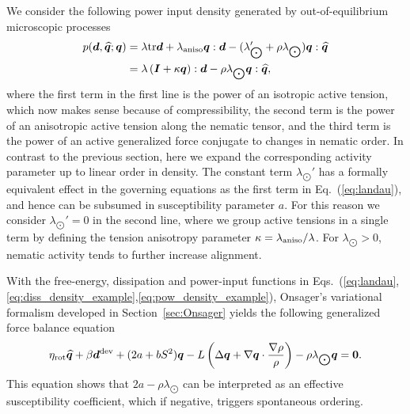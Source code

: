 \documentclass[12pt]{iopart}
\begin{document}
	
	We consider the following power input density generated by out-of-equilibrium microscopic processes 
	\begin{eqnarray} 
		p(\bm{d},\widehat{\bm{q}};{\bm{q}})  & =  \lambda \textup{tr}\bm{d} + \lambda_{\rm aniso} \bm{q}:\bm{d} - (\lambda_{\bigodot}' + \rho \lambda_{\bigodot})  \bm{q} : \widehat{\bm{q}}  \nonumber \\ 
		& =   \lambda \left(\bm{I} + \kappa \bm{q}\right) : \bm{d} - \rho \lambda_{\bigodot}  \bm{q} : \widehat{\bm{q}}, 
		\label{eq:pow_density_example}
	\end{eqnarray}
	where the first term in the first line is the power of an isotropic active tension, which now makes sense because of compressibility, the second term is the power of an anisotropic active tension along the  nematic tensor, and the third term is the power of an active generalized force conjugate to changes in nematic order. In contrast to the previous section, here we expand the corresponding activity parameter up to linear order in density. The constant term $\lambda_{\bigodot}'$ has a formally equivalent effect in the governing equations as the first term in Eq.~(\ref{eq:landau}), and hence can be subsumed in susceptibility parameter $a$.  For this reason we consider $\lambda_{\bigodot}'= 0$ in the second line, where  we group active tensions in a single term by defining the tension anisotropy parameter $\kappa=\lambda_{\rm aniso}/\lambda$. For $\lambda_{\bigodot}>0$, nematic activity tends to further increase alignment.
	
	
	With the free-energy, dissipation and power-input functions in Eqs.~(\ref{eq:landau},\ref{eq:diss_density_example},\ref{eq:pow_density_example}), Onsager's variational formalism developed in Section~\ref{sec:Onsager} yields the following generalized force balance equation
	\begin{equation}  \label{first_govern}
		\eta_{\text{rot}} \widehat{\bm{q}} + \beta \bm{d}^{\rm dev} + (2a + b S^2)  \bm{q} - L \left(\Delta \bm{q} +   \nabla\bm{q} \cdot \frac{\nabla \rho}{\rho} \right) - \rho\lambda_{\bigodot} \bm{q} = \bm{0}.
	\end{equation}
	This equation shows that $2a-\rho \lambda_{\bigodot}$ can be interpreted as an effective susceptibility coefficient, which if negative, triggers spontaneous ordering. 
	
\end{document}
